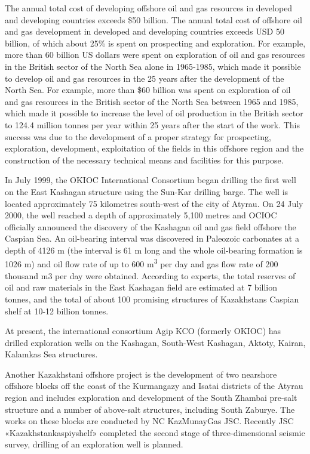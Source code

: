 \begin{multicols}{2}
The annual total cost of developing offshore oil and gas resources in
developed and developing countries exceeds \$50 billion. The annual
total cost of offshore oil and gas development in developed and
developing countries exceeds USD 50 billion, of which about 25\% is
spent on prospecting and exploration. For example, more than 60 billion
US dollars were spent on exploration of oil and gas resources in the
British sector of the North Sea alone in 1965-1985, which made it
possible to develop oil and gas resources in the 25 years after the
development of the North Sea. For example, more than \$60 billion was
spent on exploration of oil and gas resources in the British sector of
the North Sea between 1965 and 1985, which made it possible to increase
the level of oil production in the British sector to 124.4 million
tonnes per year within 25 years after the start of the work. This
success was due to the development of a proper strategy for prospecting,
exploration, development, exploitation of the fields in this offshore
region and the construction of the necessary technical means and
facilities for this purpose.

In July 1999, the OKIOC International Consortium began drilling the
first well on the East Kashagan structure using the Sun-Kar drilling
barge. The well is located approximately 75 kilometres south-west of the
city of Atyrau. On 24 July 2000, the well reached a depth of
approximately 5,100 metres and OCIOC officially announced the discovery
of the Kashagan oil and gas field offshore the Caspian Sea. An
oil-bearing interval was discovered in Paleozoic carbonates at a depth
of 4126 m (the interval is 61 m long and the whole oil-bearing formation
is 1026 m) and oil flow rate of up to 600 m\textsuperscript{3} per day
and gas flow rate of 200 thousand m3 per day were obtained. According to
experts, the total reserves of oil and raw materials in the East
Kashagan field are estimated at 7 billion tonnes, and the total of about
100 promising structures of Kazakhstan\textquotesingle s Caspian shelf
at 10-12 billion tonnes.

At present, the international consortium Agip KCO (formerly OKIOC) has
drilled exploration wells on the Kashagan, South-West Kashagan, Aktoty,
Kairan, Kalamkas Sea structures.

Another Kazakhstani offshore project is the development of two nearshore
offshore blocks off the coast of the Kurmangazy and Isatai districts of
the Atyrau region and includes exploration and development of the South
Zhambai pre-salt structure and a number of above-salt structures,
including South Zaburye. The works on these blocks are conducted by NC
KazMunayGas JSC. Recently JSC «Kazakhstankaspiyshelf» completed the
second stage of three-dimensional seismic survey, drilling of an
exploration well is planned.


\end{multicols}

